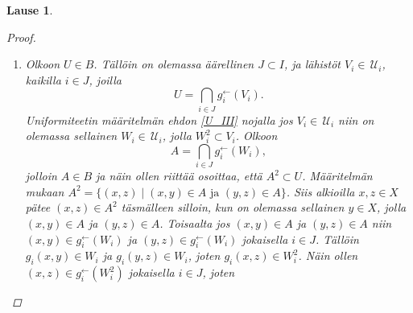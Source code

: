 \documentclass[12pt,a4paper,leqno]{report}
\newcommand{\U}{\,\mathcal{U}}
\theoremstyle{plain}
\newtheorem{lause}[equation]{Lause}
\theoremstyle{definition}
\theoremstyle{remark}
\begin{document}
\begin{lause}
\begin{proof}
\begin{enumerate}
\begin{equation*}
\end{equation*}
jolloin vaadittu ehto pätee muodossa $U^{-1}\subset U^{-1}$.
%
\item[\ref{U'_III}] 
Olkoon $U\in B$. Tällöin on olemassa äärellinen $J\subset I$, 
ja lähistöt $V_i\in\U_i$, kaikilla $i\in J$, 
joilla
\begin{equation*}
U=\bigcap_{i\in J}g^{\leftarrow}_{i}(V_{i}).
\end{equation*}
Uniformiteetin määritelmän ehdon \ref{U_III} nojalla jos $V_i\in\U_i$ niin on olemassa sellainen $W_i\in\U_i$, jolla $W^2_i\subset V_i$. 
Olkoon 
\begin{equation*}
A=\bigcap_{i\in J}g^{\leftarrow}_{i}(W_{i}),
\end{equation*}
jolloin $A\in B$ ja näin ollen riittää osoittaa, että $A^2\subset U$. %
Määritelmän mukaan $A^2=\{(x,z)\mid (x,y)\in A\text{ ja }(y,z)\in A\}$. 
Siis alkioilla $x,z\in X$ pätee $(x,z)\in A^2$ täsmälleen silloin, 
kun on olemassa sellainen $y\in X$, 
jolla $(x,y)\in A$ ja $(y,z)\in A$. 
Toisaalta jos $(x,y)\in A$ ja $(y,z)\in A$ 
niin $(x,y)\in g^{\leftarrow}_{i}(W_{i})$ 
ja $(y,z)\in g^{\leftarrow}_{i}(W_{i})$ 
jokaisella $i\in J$. 
Tällöin $g_i(x,y)\in W_{i}$ ja $g_i(y,z)\in W_{i}$, 
joten $g_i(x,z)\in W_{i}^2$. 
Näin ollen $(x,z)\in g^{\leftarrow}_{i}(W_{i}^2)$ 
jokaisella $i\in J$, joten 
\begin{equation*}

\end{equation*}
\end{enumerate}
\end{proof}
\end{lause}
\end{document}
